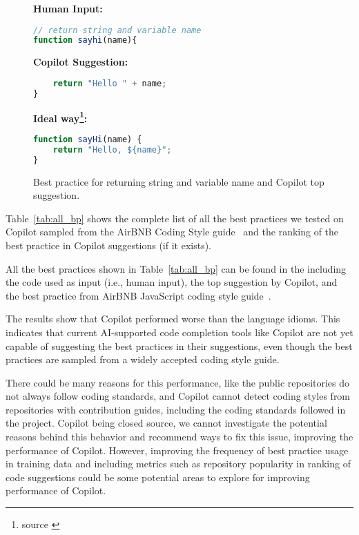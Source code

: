 \begin{figure}[hbt!]
    \centering
\begin{tcolorbox}[title=Return string and variable name,boxsep=.15mm]
\textbf{Human Input:}
\begin{lstlisting}[language=JavaScript]
// return string and variable name
function sayhi(name){
\end{lstlisting}
\tcbline
\textbf{Copilot Suggestion:}
\begin{lstlisting}[language=JavaScript,escapechar=\%]
% \noindent\textcolor{gray}{function sayhi(name)\{ } %
    return "Hello " + name;
}
\end{lstlisting}
\tcbline
\textbf{Ideal way\footnote{source \cite{airbnb_code}}:}
\begin{lstlisting}[language=JavaScript]
function sayHi(name) {
    return "Hello, ${name}";
}
\end{lstlisting}
\end{tcolorbox}
    \caption{Best practice for returning string and variable name and Copilot top suggestion.}
    \label{fig:bp_3}
\end{figure}

Table~\ref{tab:all_bp} shows the complete list of all the best practices we tested on Copilot sampled from the AirBNB Coding Style guide~\cite{airbnb_code} and the ranking of the best practice in Copilot suggestions (if it exists).

All the best practices shown in Table~\ref{tab:all_bp} can be found in the \repl{} including the code used as input (i.e., human input), the top suggestion by Copilot, and the best practice from AirBNB JavaScript coding style guide~\cite{airbnb_code}.

The results show that Copilot performed worse than the language idioms. This indicates that current AI-supported
code completion tools like Copilot are not yet capable of suggesting the best practices in their suggestions, even though the best practices are sampled from a widely accepted coding style guide.

There could be many reasons for this performance, like the public repositories do not always follow coding standards, and Copilot cannot detect coding styles from repositories with contribution guides, including the coding standards followed in the project. 
Copilot being closed source, we cannot investigate the potential reasons behind this behavior and recommend ways to fix this issue, improving the performance of Copilot. However, improving the frequency of best practice usage in training data and including metrics such as repository popularity in ranking of code suggestions could be some potential areas to explore for improving performance of Copilot.

